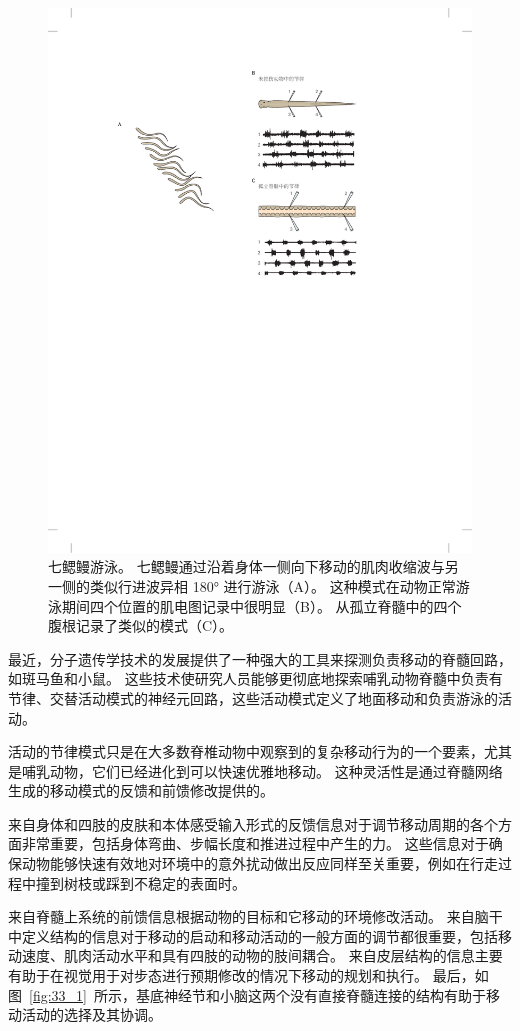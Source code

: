 \begin{figure}[htbp]
	\centering
	\includegraphics[width=0.84\linewidth]{chap33/fig_33_3}
	\caption{七鳃鳗游泳。
	七鳃鳗通过沿着身体一侧向下移动的肌肉收缩波与另一侧的类似行进波异相 180° 进行游泳（A）。
	这种模式在动物正常游泳期间四个位置的肌电图记录中很明显（B）。
	从孤立脊髓中的四个腹根记录了类似的模式（C）。}
	\label{fig:33_3}
\end{figure}


最近，分子遗传学技术的发展提供了一种强大的工具来探测负责移动的脊髓回路，如斑马鱼和小鼠。
这些技术使研究人员能够更彻底地探索哺乳动物脊髓中负责有节律、交替活动模式的神经元回路，这些活动模式定义了地面移动和负责游泳的活动。


活动的节律模式只是在大多数脊椎动物中观察到的复杂移动行为的一个要素，尤其是哺乳动物，它们已经进化到可以快速优雅地移动。
这种灵活性是通过脊髓网络生成的移动模式的反馈和前馈修改提供的。


来自身体和四肢的皮肤和本体感受输入形式的反馈信息对于调节移动周期的各个方面非常重要，包括身体弯曲、步幅长度和推进过程中产生的力。
这些信息对于确保动物能够快速有效地对环境中的意外扰动做出反应同样至关重要，例如在行走过程中撞到树枝或踩到不稳定的表面时。


来自脊髓上系统的前馈信息根据动物的目标和它移动的环境修改活动。
来自脑干中定义结构的信息对于移动的启动和移动活动的一般方面的调节都很重要，包括移动速度、肌肉活动水平和具有四肢的动物的肢间耦合。
来自皮层结构的信息主要有助于在视觉用于对步态进行预期修改的情况下移动的规划和执行。
最后，如图~\ref{fig:33_1}~所示，基底神经节和小脑这两个没有直接脊髓连接的结构有助于移动活动的选择及其协调。


